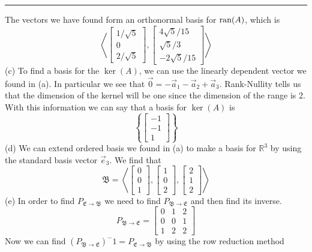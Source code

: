 \documentclass{report}
\begin{document}
\vspace{0.5em}
\hrule
\vspace{1em}
\noindent The vectors we have found form an orthonormal basis for $\operatorname{ran}(A)$, which is
$$
\left\langle\begin{bmatrix} 1/\sqrt{5} \\ 0 \\ 2/\sqrt{5} \end{bmatrix},\begin{bmatrix}4\sqrt{5}/15\\\sqrt{5}/3\\-2\sqrt{5}/15\end{bmatrix}\right\rangle
$$
(c) To find a basis for the $\ker(A)$, we can use the linearly dependent vector we found in (a). In particular we see that $\vec{0} = -\vec{a}_1 - \vec{a}_2 + \vec{a}_3$. Rank-Nullity tells us that the dimension of the kernel will be one since the dimension of the range is 2. With this information we can say that a basis for $\ker(A)$ is
$$
\left\{\begin{bmatrix}-1\\-1\\1\end{bmatrix}\right\}
$$
(d) We can extend ordered basis we found in (a) to make a basis for $\mathbb{R}^3$ by using the standard basis vector $\vec{e}_3$. We find that
$$
\mathfrak{B} = \left\langle\begin{bmatrix}0\\0\\1\end{bmatrix},\begin{bmatrix}1\\0\\2\end{bmatrix},\begin{bmatrix}2\\1\\2\end{bmatrix}\right\rangle
$$
(e) In order to find $P_{\mathfrak{E}\rightarrow\mathfrak{B}}$ we need to find $P_{\mathfrak{B}\rightarrow\mathfrak{E}}$ and then find its inverse.
$$
P_{\mathfrak{B}\rightarrow\mathfrak{E}} = \begin{bmatrix}0&1&2\\0&0&1\\1&2&2\end{bmatrix}
$$
Now we can find $(P_{\mathfrak{B}\rightarrow\mathfrak{E}})^-1=P_{\mathfrak{E}\rightarrow\mathfrak{B}}$ by using the row reduction method
\end{document}
